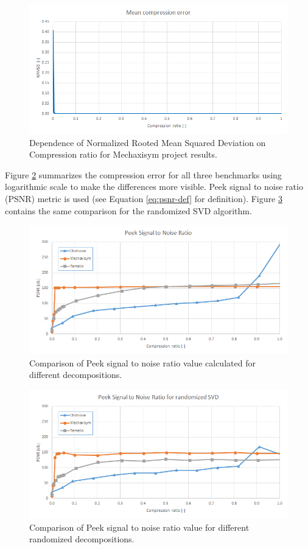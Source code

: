 \begin{figure}[H]
\centering\includegraphics[width=\textwidth]{figures/mechaxisym_NRMSD}
\caption{Dependence of Normalized Rooted Mean Squared Deviation on Compression ratio for Mechaxisym project results.}
\label{fig:mechaxisym:NRMSD}
\end{figure}

Figure \ref{fig:PSNR} summarizes the compression error for all three benchmarks using logarithmic scale to make the differences more visible. Peek signal to noise ratio (PSNR) metric is used (see Equation \ref{eq:psnr-def} for definition). Figure \ref{fig:PSNR_rand} contains the same comparison for the randomized SVD algorithm.

\begin{figure}[ht]
\centering\includegraphics[width=\textwidth]{figures/PSNR}
\caption{Comparison of Peek signal to noise ratio value calculated for different decompositions.}
\label{fig:PSNR}
\end{figure}

\begin{figure}[H]
\centering\includegraphics[width=\textwidth]{figures/PSNR_rand}
\caption{Comparison of Peek signal to noise ratio value for different randomized decompositions.}
\label{fig:PSNR_rand}
\end{figure}

